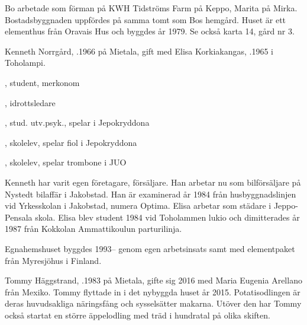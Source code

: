 Bo arbetade som förman på KWH Tidströms Farm på Keppo, Marita på Mirka. Bostadsbyggnaden uppfördes på samma tomt som Bos hemgård. Huset är ett elementhus från Oravais Hus och byggdes år 1979. Se också karta 14, gård nr 3.



%



%
Kenneth Norrgård, .1966 på Mietala, gift med Elisa Korkiakangas, .1965 i Toholampi.
\begin{jhchildren}
  \item {}, student, merkonom
  \item {}, idrottsledare
  \item {}, stud. utv.psyk., spelar i Jepokryddona
  \item {}, skolelev, spelar fiol i Jepokryddona
  \item {}, skolelev, spelar trombone i JUO
\end{jhchildren}

Kenneth har varit egen företagare, försäljare. Han arbetar nu som bilförsäljare på Nystedt bilaffär i Jakobstad. Han är examinerad år 1984 från husbyggnadslinjen vid Yrkesskolan i Jakobstad, numera Optima. Elisa arbetar som städare i Jeppo-Pensala skola. Elisa blev student 1984 vid Toholammen lukio och dimitterades år 1987 från Kokkolan Ammattikoulun parturilinja.

Egnahemshuset byggdes 1993-- genom egen arbetsinsats samt med elementpaket från Myresjöhus i Finland.



%



%
Tommy Häggstrand, .1983 på Mietala, gifte sig 2016 med Maria Eugenia Arellano från Mexiko. Tommy flyttade in i det nybyggda huset år 2015. Potatisodlingen är deras huvudsakliga näringsfång och sysselsätter makarna. Utöver den har Tommy också startat en större äppelodling med träd i hundratal på olika skiften.


